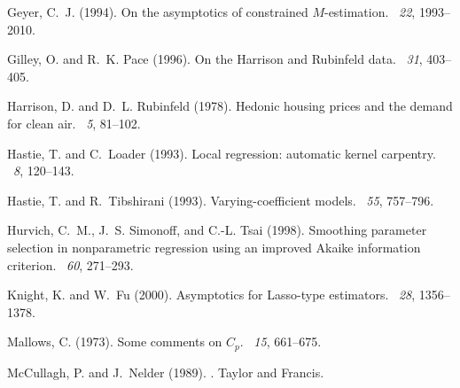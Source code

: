 \documentclass[authoryear,review, 12pt]{elsarticle}
\begin{document}
\begin{thebibliography}{}
Geyer, C.~J. (1994).
\newblock On the asymptotics of constrained ${M}$-estimation.
~{\em 22}, 1993--2010.

Gilley, O. and R.~K. Pace (1996).
\newblock On the {H}arrison and {R}ubinfeld data.
~{\em 31},
  403--405.

Harrison, D. and D.~L. Rubinfeld (1978).
\newblock Hedonic housing prices and the demand for clean air.
~{\em 5},
  81--102.

Hastie, T. and C.~Loader (1993).
\newblock Local regression: automatic kernel carpentry.
~{\em 8}, 120--143.

Hastie, T. and R.~Tibshirani (1993).
\newblock Varying-coefficient models.
~{\em 55},
  757--796.

Hurvich, C.~M., J.~S. Simonoff, and C.-L. Tsai (1998).
\newblock Smoothing parameter selection in nonparametric regression using an
  improved {A}kaike information criterion.
~{\em 60},
  271--293.

Knight, K. and W.~Fu (2000).
\newblock Asymptotics for {L}asso-type estimators.
~{\em 28}, 1356--1378.

Mallows, C. (1973).
\newblock Some comments on ${C}_p$.
~{\em 15}, 661--675.

McCullagh, P. and J.~Nelder (1989).
.
\newblock Taylor and Francis.


\end{thebibliography}
\end{document}
